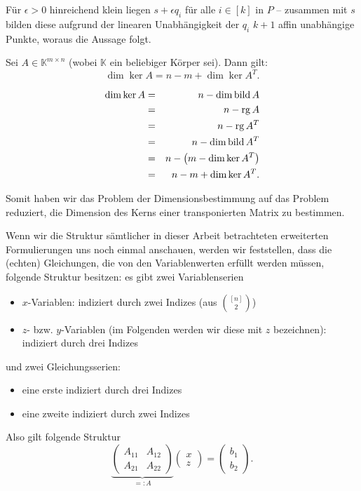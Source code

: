 \documentclass[10p,a4paper,BCOR = 12mm, DIV=15]{scrbook}
\begin{document}
{\begin{bew}
Für $\epsilon > 0$ hinreichend klein liegen $s+\epsilon q_i$ für alle $i \in \left[k\right]$ in $P$ -- zusammen mit $s$ bilden diese aufgrund der linearen Unabhängigkeit der $q_i$ $k+1$ affin unabhängige Punkte, woraus die Aussage folgt.
\end{bew}

\begin{Sa}
\label{sa:dim2}
Sei $A\in \mathbb{K}^{m \times n}$ (wobei $\mathbb{K}$ ein beliebiger Körper sei). Dann gilt:
\begin{displaymath}
\dim \ker A = n-m+\dim \ker A^T.
\end{displaymath}
\end{Sa}
\begin{bew}
\begin{eqnarray*}
\dim \ker A & = & n - \dim \operatorname{bild} A \\
& = & n - \operatorname{rg} A \\
& = & n - \operatorname{rg} A^T \\
& = & n - \dim \operatorname{bild} A^T \\
& = & n - \left(m - \dim \ker A^T\right) \\
& = & n - m+\dim \ker A^T.
\end{eqnarray*}
\end{bew}

Somit haben wir das Problem der Dimensionsbestimmung auf das Problem reduziert, die Dimension des Kerns einer transponierten Matrix zu bestimmen.

Wenn wir die Struktur sämtlicher in dieser Arbeit betrachteten erweiterten Formulierungen uns noch einmal anschauen, werden wir feststellen, dass die (echten) Gleichungen, die von den Variablenwerten erfüllt werden müssen, folgende Struktur besitzen: es gibt zwei Variablenserien
\begin{itemize}
\item $x$-Variablen: indiziert durch zwei Indizes (aus ${\left[n\right] \choose 2}$)
\item $z$- bzw. $y$-Variablen (im Folgenden werden wir diese mit $z$ bezeichnen): indiziert durch drei Indizes
\end{itemize}
und zwei Gleichungsserien:
\begin{itemize}
\item eine erste indiziert durch drei Indizes
\item eine zweite indiziert durch zwei Indizes
\end{itemize}

Also gilt folgende Struktur
\begin{displaymath}
\underbrace{\left(
\begin{array}{cc}
A_{11} & A_{12} \\
A_{21} & A_{22}
\end{array}
\right)}_{=: A} \left(
\begin{array}{c}
x \\
z
\end{array}
\right)
= 
\left(
\begin{array}{c}
b_{1} \\
b_{2}
\end{array}
\right).
\end{displaymath}

}
\end{document}
